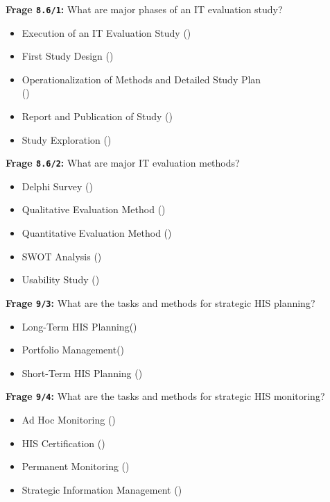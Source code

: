 \textbf{Frage \texttt{8.6/1}:} What are major phases of an IT evaluation study?

\begin{itemize}
  \item Execution of an IT Evaluation Study ()
  \item First Study Design ()
  \item Operationalization of Methods and Detailed Study Plan \\
  ()
  \item Report and Publication of Study ()
  \item Study Exploration ()
\end{itemize}

\textbf{Frage \texttt{8.6/2}:} What are major IT evaluation methods?

\begin{itemize}
  \item Delphi Survey ()
  \item Qualitative Evaluation Method ()
  \item Quantitative Evaluation Method ()
  \item SWOT Analysis ()
  \item Usability Study ()
\end{itemize}

\textbf{Frage \texttt{9/3}:} What are the tasks and methods for strategic HIS planning?

\begin{itemize}
  \item Long-Term HIS Planning()
  \item Portfolio Management()
  \item Short-Term HIS Planning ()
\end{itemize}

\textbf{Frage \texttt{9/4}:} What are the tasks and methods for strategic HIS monitoring?

\begin{itemize}
  \item Ad Hoc Monitoring ()
  \item HIS Certification ()
  \item Permanent Monitoring ()
  \item Strategic Information Management ()
\end{itemize}

